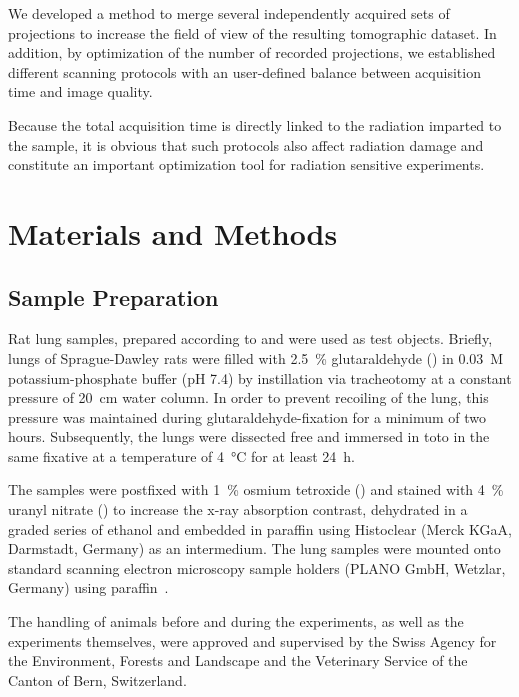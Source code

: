 \documentclass[preprint,s]{iucr}
\begin{document}
We developed a method to merge several independently acquired sets of projections to increase the field of view of the resulting tomographic dataset. In addition, by optimization of the number of recorded projections, we established different scanning protocols with an user-defined balance between acquisition time and image quality.

Because the total acquisition time is directly linked to the radiation imparted to the sample, it is obvious that such protocols also affect radiation damage and constitute an important optimization tool for radiation sensitive experiments.

\section{Materials and Methods}\label{sec:materials and methods}
\subsection{Sample Preparation}
Rat lung samples, prepared according to  and  were used as test objects. Briefly, lungs of Sprague-Dawley rats were filled with \SI{2.5}{\percent} glutaraldehyde () in \SI{0.03}{M} potassium-phosphate buffer (pH 7.4) by instillation via tracheotomy at a constant pressure of \SI{20}{\centi\meter} water column. In order to prevent recoiling of the lung, this pressure was maintained during glutaraldehyde-fixation for a minimum of two hours. Subsequently, the lungs were dissected free and immersed in toto in the same fixative at a temperature of \SI{4}{\celsius} for at least \SI{24}{\hour}.

The samples were postfixed with \SI{1}{\percent} osmium tetroxide () and stained with \SI{4}{\percent} uranyl nitrate () to increase the x-ray absorption contrast, dehydrated in a graded series of ethanol and embedded in paraffin using Histoclear (Merck KGaA, Darmstadt, Germany) as an intermedium. The lung samples were mounted onto standard scanning electron microscopy sample holders (PLANO GmbH, Wetzlar, Germany) using paraffin~\cite{Tsuda2008}.

The handling of animals before and during the experiments, as well as the experiments themselves, were approved and supervised by the Swiss Agency for the Environment, Forests and Landscape and the Veterinary Service of the Canton of Bern, Switzerland.
\end{document}
